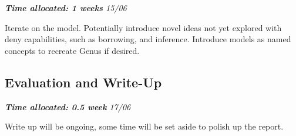 \textit{\textbf{Time allocated: 1 weeks} \hfill 15/06}

Iterate on the model. Potentially introduce novel ideas not yet explored with deny capabilities, such as borrowing, and inference. Introduce models as named concepts to recreate Genus if desired.

\subsection{Evaluation and Write-Up}

\textit{\textbf{Time allocated: 0.5 week} \hfill 17/06}

Write up will be ongoing, some time will be set aside to polish up the report.